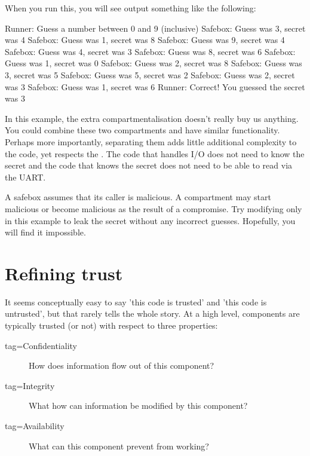 \codelisting[marker=runner,caption=The runner compartment for the guess-the-numbers game,label=lst:guessthenumberrunner, filename=examples/safebox/runner.cc]{}

When you run this, you will see output something like the following:

\begin{console}
Runner: Guess a number between 0 and 9 (inclusive)
Safebox: Guess was 3, secret was 4
Safebox: Guess was 1, secret was 8
Safebox: Guess was 9, secret was 4
Safebox: Guess was 4, secret was 3
Safebox: Guess was 8, secret was 6
Safebox: Guess was 1, secret was 0
Safebox: Guess was 2, secret was 8
Safebox: Guess was 3, secret was 5
Safebox: Guess was 5, secret was 2
Safebox: Guess was 2, secret was 3
Safebox: Guess was 1, secret was 6
Runner: Correct!  You guessed the secret was 3
\end{console}

In this example, the extra compartmentalisation doesn't really buy us anything.
You could combine these two compartments and have similar functionality.
Perhaps more importantly, separating them adds little additional complexity to the code, yet respects the .
The code that handles I/O does not need to know the secret and the code that knows the secret does not need to be able to read via the UART.

A safebox assumes that its caller is malicious.
A compartment may start malicious or become malicious as the result of a compromise.
Try modifying only  in this example to leak the secret without any incorrect guesses.
Hopefully, you will find it impossible.

\section{Refining trust}

It seems conceptually easy to say 'this code is trusted' and 'this code is untrusted', but that rarely tells the whole story.
At a high level, components are typically trusted (or not) with respect to three properties:

\begin{description}
	\item[tag=Confidentiality]{How does information flow out of this component?}
	\item[tag=Integrity]{What how can information be modified by this component?}
	\item[tag=Availability]{What can this component prevent from working?}
\end{description}

